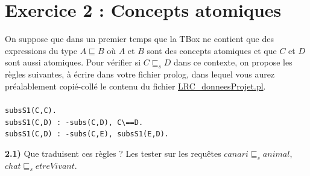 \documentclass[a4paper,12pt]{report}
\begin{document}

\section*{Exercice 2 : Concepts atomiques}

On suppose que dans un premier temps que la TBox ne contient que des expressions du type \(A \sqsubseteq B\) où \(A\) et \(B\) sont des concepts
    atomiques et que \(C\) et \(D\) sont aussi atomiques. Pour vérifier si \(C \sqsubseteq_s D\) dans ce contexte, on propose les règles suivantes,
    à écrire dans votre fichier prolog, dans lequel vous aurez préalablement copié-collé le contenu du fichier \href{./src/LRC\_donneesProjet.pl}{LRC\_donneesProjet.pl}.\\\\
\texttt{subsS1(C,C).}\\
\texttt{subsS1(C,D) : -subs(C,D), C\textbackslash==D.}\\
\texttt{subsS1(C,D) : -subs(C,E), subsS1(E,D).}\\




\vspace{0.5cm}

{}

\textbf{2.1)} Que traduisent ces règles ? Les tester sur les requêtes \(canari \sqsubseteq_s animal\), \(chat \sqsubseteq_s etreVivant\).
\end{document}
